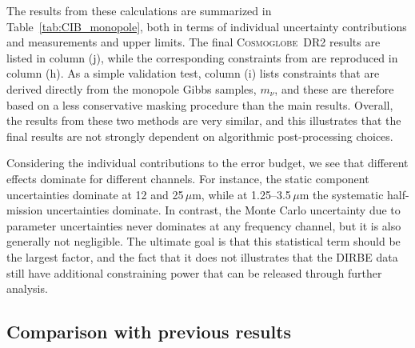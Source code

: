 \documentclass{aa}
\newcommand{\cosmoglobe}{\textsc{Cosmoglobe}}
\begin{document}

The results from these calculations are summarized in
Table~\ref{tab:CIB_monopole}, both in terms of individual uncertainty
contributions and measurements and upper limits. The final
\cosmoglobe\ DR2 results are listed in column (j), while the
corresponding constraints from \citet{hauser1998} are reproduced in
column (h). As a simple validation test, column (i) lists constraints
that are derived directly from the monopole Gibbs samples, $m_{\nu}$,
and these are therefore based on a less conservative masking procedure
than the main results. Overall, the results from these two methods are
very similar, and this illustrates that the final results are not
strongly dependent on algorithmic post-processing choices.

Considering the individual contributions to the error budget, we see that
different effects dominate for different channels. For instance, the static
component uncertainties dominate at 12 and 25$\,\mu\mathrm{m}$, while at
1.25--3.5$\,\mu\mathrm{m}$ the systematic half-mission uncertainties dominate.
In contrast, the Monte Carlo uncertainty due to parameter uncertainties never
dominates at any frequency channel, but it is also generally not negligible.
The ultimate goal is that this statistical term should be the largest factor,
and the fact that it does not illustrates that the DIRBE data still have
additional constraining power that can be released through further analysis.

\subsection{Comparison with previous results}
\end{document}
